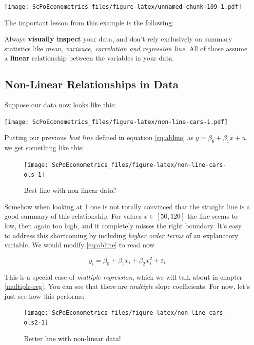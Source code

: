 \documentclass[]{book}
\newenvironment{warning}{\begin{tcolorbox}[colback=orange!5!white,colframe=orange,title=\textbf{Warning!}]}{\end{tcolorbox}}
\theoremstyle{definition}
\theoremstyle{definition}
\theoremstyle{definition}
\theoremstyle{remark}
\begin{document}
\texttt{[image: ScPoEconometrics\_files/figure-latex/unnamed-chunk-109-1.pdf]}

The important lesson from this example is the following:

\begin{warning}
Always \textbf{visually inspect} your data, and don't rely exclusively
on summary statistics like \emph{mean, variance, correlation and
regression line}. All of those assume a \textbf{linear} relationship
between the variables in your data.
\end{warning}

\subsection{Non-Linear Relationships in
Data}\label{non-linear-relationships-in-data}

Suppose our data now looks like this:

\texttt{[image: ScPoEconometrics\_files/figure-latex/non-line-cars-1.pdf]}

Putting our previous \emph{best line} defined in equation
\eqref{eq:abline} as \(y = \beta_0 + \beta_1 x + u\), we get something
like this:

\begin{figure}

{\centering \texttt{[image: ScPoEconometrics\_files/figure-latex/non-line-cars-ols-1]} 

}

\caption{Best line with non-linear data?}\label{fig:non-line-cars-ols}
\end{figure}

Somehow when looking at \ref{fig:non-line-cars-ols} one is not totally
convinced that the straight line is a good summary of this relationship.
For values \(x\in[50,120]\) the line seems to low, then again too high,
and it completely misses the right boundary. It's easy to address this
shortcoming by including \emph{higher order terms} of an explanatory
variable. We would modify \eqref{eq:abline} to read now

\[
y_i = \beta_0 + \beta_1 x_i + \beta_2 x_i^2 + \varepsilon_i \label{eq:abline2}
\]

This is a special case of \emph{multiple regression}, which we will talk
about in chapter \ref{multiple-reg}. You can see that there are
\emph{multiple} slope coefficients. For now, let's just see how this
performs:

\begin{figure}

{\centering \texttt{[image: ScPoEconometrics\_files/figure-latex/non-line-cars-ols2-1]} 

}

\caption{Better line with non-linear data!}\label{fig:non-line-cars-ols2}
\end{figure}
\end{document}
